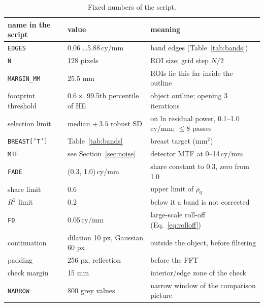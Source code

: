 \documentclass[11pt,a4paper]{article}
\newcommand{\cymm}{\,cy/mm}
\newcommand{\code}[1]{\texttt{#1}}
\begin{document}
\begin{table}[H]\centering\small
\caption{Fixed numbers of the script.}
\begin{tabular}{lll}
\toprule
name in the script & value & meaning \\
\midrule
\code{EDGES} & 0.06 \ldots 5.88\cymm & band edges (Table~\ref{tab:bands}) \\
\code{N} & 128 pixels & ROI size; grid step $N/2$ \\
\code{MARGIN\_MM} & 25.5 mm & ROIs lie this far inside the outline \\
footprint threshold & $0.6\times$ 99.5th percentile of HE & object outline; opening 3 iterations \\
selection limit & median $+\,3.5$ robust SD & on ln residual power, 0.1--1.0\cymm; $\le8$ passes \\
\code{BREAST['T']} & Table~\ref{tab:bands} & breast target (mm$^2$) \\
\code{MTF} & see Section~\ref{sec:noise} & detector MTF at 0--14\cymm \\
\code{FADE} & (0.3, 1.0)\cymm & share constant to 0.3, zero from 1.0 \\
share limit & 0.6 & upper limit of $\rho_0$ \\
$R^2$ limit & 0.2 & below it a band is not corrected \\
\code{F0} & 0.05\cymm & large-scale roll-off (Eq.~\ref{eq:rolloff}) \\
continuation & dilation 10 px, Gaussian 60 px & outside the object, before filtering \\
padding & 256 px, reflection & before the FFT \\
check margin & 15 mm & interior/edge zone of the check \\
\code{NARROW} & 800 grey values & narrow window of the comparison picture \\
\bottomrule
\end{tabular}
\end{table}
\end{document}
